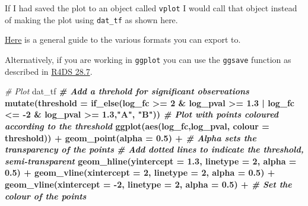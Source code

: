 \documentclass[12pt,]{book}
\newenvironment{Shaded}{\begin{snugshade}}{\end{snugshade}}
\newcommand{\CommentTok}[1]{\textcolor[rgb]{0.56,0.35,0.01}{\textit{#1}}}
\newcommand{\DataTypeTok}[1]{\textcolor[rgb]{0.13,0.29,0.53}{#1}}
\newcommand{\DecValTok}[1]{\textcolor[rgb]{0.00,0.00,0.81}{#1}}
\newcommand{\FloatTok}[1]{\textcolor[rgb]{0.00,0.00,0.81}{#1}}
\newcommand{\KeywordTok}[1]{\textcolor[rgb]{0.13,0.29,0.53}{\textbf{#1}}}
\newcommand{\NormalTok}[1]{#1}
\newcommand{\OperatorTok}[1]{\textcolor[rgb]{0.81,0.36,0.00}{\textbf{#1}}}
\newcommand{\StringTok}[1]{\textcolor[rgb]{0.31,0.60,0.02}{#1}}
\begin{document}
If I had saved the plot to an object called \texttt{vplot} I would call that object
instead of making the plot using \texttt{dat\_tf} as shown here.

\href{https://www.stat.berkeley.edu/classes/s133/saving.html}{Here} is a general
guide to the various formats you can export to.

Alternatively, if you are working in \texttt{ggplot} you can use the \texttt{ggsave} function
as described in \href{http://r4ds.had.co.nz/graphics-for-communication.html\#saving-your-plots}{R4DS 28.7}.

\begin{Shaded}
\begin{Highlighting}[]
\CommentTok{# Plot}
\NormalTok{dat_tf }\OperatorTok{%
\StringTok{  }\CommentTok{# Add a threhold for significant observations}
\StringTok{  }\KeywordTok{mutate}\NormalTok{(}\DataTypeTok{threshold =} \KeywordTok{if_else}\NormalTok{(log_fc }\OperatorTok{>=}\StringTok{ }\DecValTok{2} \OperatorTok{&}\StringTok{ }\NormalTok{log_pval }\OperatorTok{>=}\StringTok{ }\FloatTok{1.3} \OperatorTok{|}
\StringTok{                               }\NormalTok{log_fc }\OperatorTok{<=}\StringTok{ }\DecValTok{-2} \OperatorTok{&}\StringTok{ }\NormalTok{log_pval }\OperatorTok{>=}\StringTok{ }\FloatTok{1.3}\NormalTok{,}\StringTok{"A"}\NormalTok{, }\StringTok{"B"}\NormalTok{)) }\OperatorTok{%
\StringTok{  }\CommentTok{# Plot with points coloured according to the threshold}
\StringTok{  }\KeywordTok{ggplot}\NormalTok{(}\KeywordTok{aes}\NormalTok{(log_fc,log_pval, }\DataTypeTok{colour =}\NormalTok{ threshold)) }\OperatorTok{+}
\StringTok{  }\KeywordTok{geom_point}\NormalTok{(}\DataTypeTok{alpha =} \FloatTok{0.5}\NormalTok{) }\OperatorTok{+}\StringTok{ }\CommentTok{# Alpha sets the transparency of the points}
\StringTok{  }\CommentTok{# Add dotted lines to indicate the threshold, semi-transparent}
\StringTok{  }\KeywordTok{geom_hline}\NormalTok{(}\DataTypeTok{yintercept =} \FloatTok{1.3}\NormalTok{, }\DataTypeTok{linetype =} \DecValTok{2}\NormalTok{, }\DataTypeTok{alpha =} \FloatTok{0.5}\NormalTok{) }\OperatorTok{+}\StringTok{ }
\StringTok{  }\KeywordTok{geom_vline}\NormalTok{(}\DataTypeTok{xintercept =} \DecValTok{2}\NormalTok{, }\DataTypeTok{linetype =} \DecValTok{2}\NormalTok{, }\DataTypeTok{alpha =} \FloatTok{0.5}\NormalTok{) }\OperatorTok{+}
\StringTok{  }\KeywordTok{geom_vline}\NormalTok{(}\DataTypeTok{xintercept =} \DecValTok{-2}\NormalTok{, }\DataTypeTok{linetype =} \DecValTok{2}\NormalTok{, }\DataTypeTok{alpha =} \FloatTok{0.5}\NormalTok{) }\OperatorTok{+}
\StringTok{  }\CommentTok{# Set the colour of the points}
}}
\end{Highlighting}
\end{Shaded}
\end{document}
